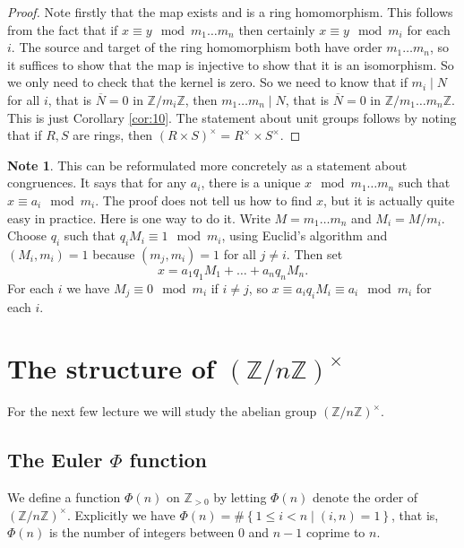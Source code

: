 \documentclass{article}
\newcommand{\Z}{\mathbb{Z}}
\newcommand{\rb}[1]{\left( #1 \right)}
\newcommand{\cb}[1]{\left\{ #1 \right\}}
\newcommand{\unit}[1]{\rb{\Z / #1\Z}^\times}
\theoremstyle{definition}\newtheorem{definition}{Definition}
\theoremstyle{definition}\newtheorem*{remark}{Remark}
\theoremstyle{definition}\newtheorem*{example}{Example}
\theoremstyle{definition}\newtheorem*{note}{Note}
\begin{document}
\begin{proof}
Note firstly that the map exists and is a ring homomorphism. This follows from the fact that if $ x \equiv y \mod m_1 \dots m_n $ then certainly $ x \equiv y \mod m_i $ for each $ i $. The source and target of the ring homomorphism both have order $ m_1 \dots m_n $, so it suffices to show that the map is injective to show that it is an isomorphism. So we only need to check that the kernel is zero. So we need to know that if $ m_i \mid N $ for all $ i $, that is $ \overline{N} = 0 $ in $ \Z / m_i\Z $, then $ m_1 \dots m_n \mid N $, that is $ \overline{N} = 0 $ in $ \Z / m_1 \dots m_n\Z $. This is just Corollary \ref{cor:10}. The statement about unit groups follows by noting that if $ R, S $ are rings, then $ \rb{R \times S}^\times = R^\times \times S^\times $.
\end{proof}

\begin{note}
This can be reformulated more concretely as a statement about congruences. It says that for any $ a_i $, there is a unique $ x \mod m_1 \dots m_n $ such that $ x \equiv a_i \mod m_i $. The proof does not tell us how to find $ x $, but it is actually quite easy in practice. Here is one way to do it. Write $ M = m_1 \dots m_n $ and $ M_i = M / m_i $. Choose $ q_i $ such that $ q_iM_i \equiv 1 \mod m_i $, using Euclid's algorithm and $ \rb{M_i, m_i} = 1 $ because $ \rb{m_j, m_i} = 1 $ for all $ j \ne i $. Then set
$$ x = a_1q_1M_1 + \dots + a_nq_nM_n. $$
For each $ i $ we have $ M_j \equiv 0 \mod m_i $ if $ i \ne j $, so $ x \equiv a_iq_iM_i \equiv a_i \mod m_i $ for each $ i $.
\end{note}

\section{The structure of $ \unit{n} $}

For the next few lecture we will study the abelian group $ \unit{n} $.

\subsection{The Euler $ \Phi $ function}

We define a function $ \Phi\rb{n} $ on $ \Z_{> 0} $ by letting $ \Phi\rb{n} $ denote the order of $ \unit{n} $. Explicitly we have $ \Phi\rb{n} = \#\cb{1 \le i < n \mid \rb{i, n} = 1} $, that is, $ \Phi\rb{n} $ is the number of integers between $ 0 $ and $ n - 1 $ coprime to $ n $.
\end{document}
